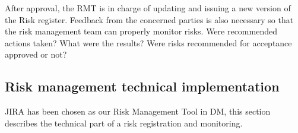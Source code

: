 After approval, the RMT is in charge of updating and issuing a new version of the Risk register. Feedback from the concerned parties is also necessary so that the risk management team can properly monitor risks. Were recommended actions taken? What were the results? Were risks recommended for acceptance approved or not?

\subsection{Risk management technical implementation \label{sect:technical} }
JIRA has been chosen as our Risk Management Tool in DM, this section describes the technical part of a risk registration and monitoring.


